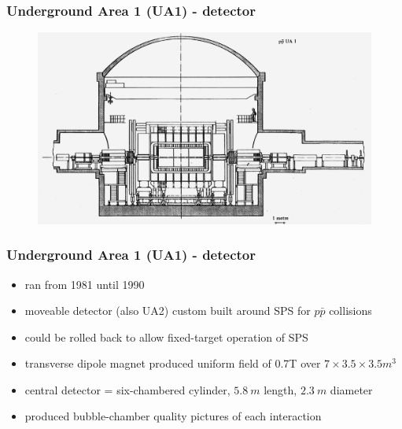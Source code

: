 \documentclass[xcolor=table]{beamer}
\begin{document}
\begin{frame}
\frametitle{Underground Area 1 (UA1) - detector}
\fontsize{9pt}{12}\selectfont

\begin{figure}[h]
\centering
\includegraphics[height=0.7\textheight]{images/ua1-sideview.png}
\end{figure}

\end{frame}


\begin{frame}
\frametitle{Underground Area 1 (UA1) - detector}
\fontsize{9pt}{12}\selectfont

\begin{itemize}
\item ran from 1981 until 1990
\item moveable detector (also UA2) custom built around SPS for $p\bar{p}$ collisions
\item could be rolled back to allow fixed-target operation of SPS
\end{itemize}

\begin{itemize}
\item transverse dipole magnet produced uniform field of 0.7T over $7\times 3.5\times 3.5\si{m^3}$
\item central detector = six-chambered cylinder, $\SI{5.8}{m}$ length, $\SI{2.3}{m}$ diameter
\item produced bubble-chamber quality pictures of each interaction
\end{itemize}


\end{frame}
\end{document}
